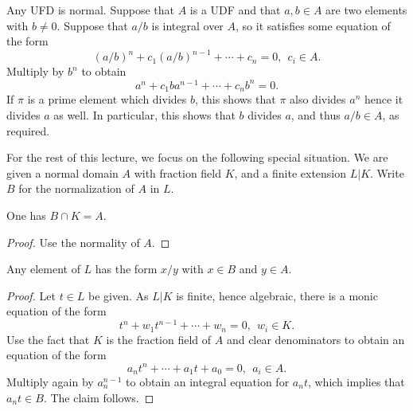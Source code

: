 \begin{example}
  Any UFD is normal.
  Suppose that $A$ is a UDF and that $a,b \in A$ are two elements with $b \neq 0$.
  Suppose that $a/b$ is integral over $A$, so it satisfies some equation of the form
  \[ (a/b)^{n} + c_{1} (a/b)^{n-1} + \cdots + c_{n} = 0, \ \ c_{i} \in A. \]
  Multiply by $b^{n}$ to obtain
  \[ a^{n} + c_{1} b a^{n-1} + \cdots + c_{n} b^{n} = 0. \]
  If $\pi$ is a prime element which divides $b$, this shows that $\pi$ also divides $a^{n}$ hence it divides $a$ as well.
  In particular, this shows that $b$ divides $a$, and thus $a/b \in A$, as required.
\end{example}

For the rest of this lecture, we focus on the following special situation.
We are given a normal domain $A$ with fraction field $K$, and a finite extension $L|K$.
Write $B$ for the normalization of $A$ in $L$.

\begin{lemma}
  One has $B \cap K = A$.
\end{lemma}
\begin{proof}
  Use the normality of $A$.
\end{proof}

\begin{lemma}
  Any element of $L$ has the form $x/y$ with $x \in B$ and $y \in A$.
\end{lemma}
\begin{proof}
  Let $t \in L$ be given.
  As $L|K$ is finite, hence algebraic, there is a monic equation of the form
  \[ t^{n} + w_{1} t^{n-1} + \cdots + w_{n} = 0, \ \ w_{i} \in K. \]
  Use the fact that $K$ is the fraction field of $A$ and clear denominators to obtain an equation of the form
  \[ a_{n} t^{n} + \cdots + a_{1} t + a_{0} = 0, \ \ a_{i} \in A. \]
  Multiply again by $a_{n}^{n-1}$ to obtain an integral equation for $a_{n} t$, which implies that $a_{n} t \in B$.
  The claim follows.
\end{proof}

